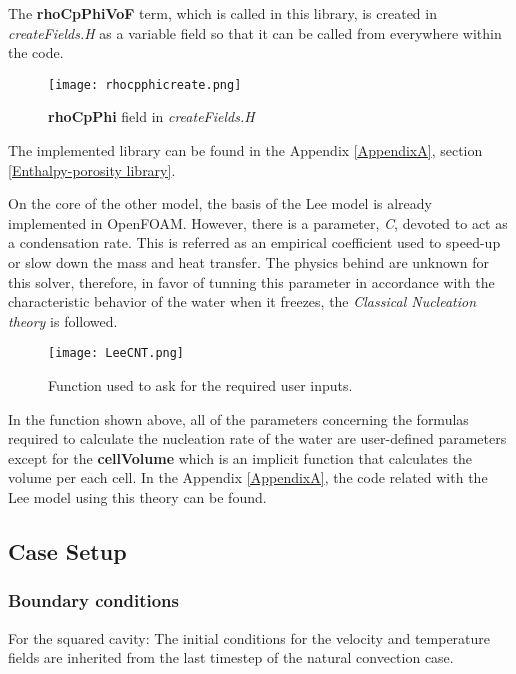 The \textbf{rhoCpPhiVoF} term, which is called in this library, is created in \textit{createFields.H} as a variable field so that it can be called from everywhere within the code.
\clearpage
\begin{figure}[h!]
	\centering
	\texttt{[image: rhocpphicreate.png]}\hfill	
	\caption{\textbf{rhoCpPhi} field in \textit{createFields.H}}
	\label{3.10fig}
\end{figure}
 
\noindent The implemented library can be found in the Appendix \ref{AppendixA}, section \ref{Enthalpy-porosity library}. 

\noindent On the core of the other model, the basis of the Lee model is already implemented in OpenFOAM. However, there is a parameter, \textit{C}, devoted to act as a condensation rate. This is referred as an empirical coefficient used to speed-up or slow down the mass and heat transfer. The physics behind are unknown for this solver, therefore, in favor of tunning this parameter in accordance with the characteristic behavior of the water when it freezes, the \textit{Classical Nucleation theory} is followed.
\newline
\begin{figure}[h!]
	\centering
	\texttt{[image: LeeCNT.png]}\hfill	
	\caption{Function used to ask for the required user inputs.}
	\label{3.11fig}
\end{figure}
\newline
In the function shown above, all of the parameters concerning the formulas required to calculate the nucleation rate of the water are user-defined parameters except for the \textbf{cellVolume} which is an implicit function that calculates the volume per each cell. In the Appendix \ref{AppendixA}, the code related with the Lee model using this theory can be found.

\subsection{Case Setup}
\subsubsection*{Boundary conditions}

For the squared cavity:
The initial conditions for the velocity and temperature fields are inherited from the last timestep of the natural convection case.


